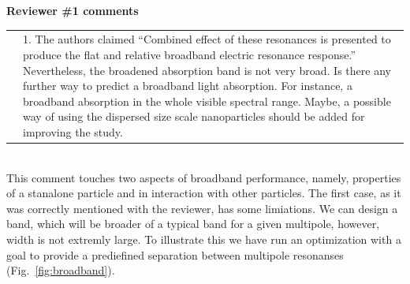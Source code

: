 \documentclass[a4paper]{article}
\begin{document}
\vspace{10pt}

\newpage
\textbf{Reviewer \#1 comments}

\begin{tabular}[!H]{l|p{}}
\quad & 1. The authors claimed “Combined effect of these resonances is presented to produce the flat and relative broadband electric resonance response.” Nevertheless, the broadened absorption band is not very broad. Is there any further way to predict a broadband light absorption. For instance, a broadband absorption in the whole visible spectral range. Maybe, a possible way of using the dispersed size scale nanoparticles should be added for improving the study. 
\end{tabular}\\

This comment touches two aspects of broadband performance, namely,
properties of a stanalone particle and in interaction with other
particles.  The first case, as it was correctly mentioned with the
reviewer, has some limiations.  We can design a band, which will be
broader of a typical band for a given multipole, however, width is
not extremly large.  To illustrate this we have run an optimization
with a goal to provide a prediefined separation between multipole
resonanses (Fig.~\ref{fig:broadband}).
\end{document}
